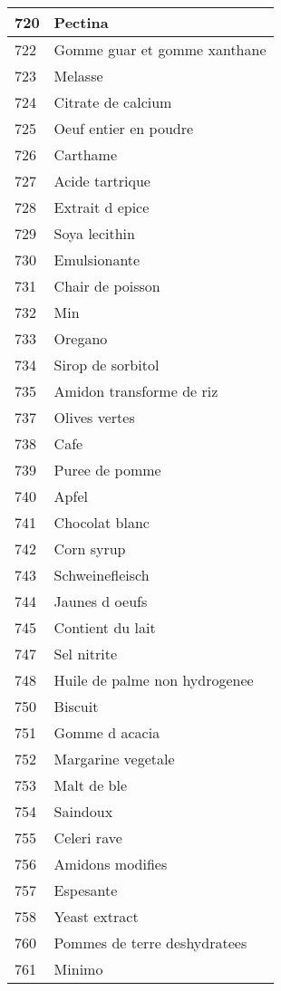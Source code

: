 \begin{longtable}{|l|l|}
720 & Pectina \\ \hline 
722 & Gomme guar et gomme xanthane \\ \hline 
723 & Melasse \\ \hline 
724 & Citrate de calcium \\ \hline 
725 & Oeuf entier en poudre \\ \hline 
726 & Carthame \\ \hline 
727 & Acide tartrique \\ \hline 
728 & Extrait d epice \\ \hline 
729 & Soya lecithin \\ \hline 
730 & Emulsionante \\ \hline 
731 & Chair de poisson \\ \hline 
732 & Min \\ \hline 
733 & Oregano \\ \hline 
734 & Sirop de sorbitol \\ \hline 
735 & Amidon transforme de riz \\ \hline 
737 & Olives vertes \\ \hline 
738 & Cafe \\ \hline 
739 & Puree de pomme \\ \hline 
740 & Apfel \\ \hline 
741 & Chocolat blanc \\ \hline 
742 & Corn syrup \\ \hline 
743 & Schweinefleisch \\ \hline 
744 & Jaunes d oeufs \\ \hline 
745 & Contient du lait \\ \hline 
747 & Sel nitrite \\ \hline 
748 & Huile de palme non hydrogenee \\ \hline 
750 & Biscuit \\ \hline 
751 & Gomme d acacia \\ \hline 
752 & Margarine vegetale \\ \hline 
753 & Malt de ble \\ \hline 
754 & Saindoux \\ \hline 
755 & Celeri rave \\ \hline 
756 & Amidons modifies \\ \hline 
757 & Espesante \\ \hline 
758 & Yeast extract \\ \hline 
760 & Pommes de terre deshydratees \\ \hline 
761 & Minimo \\ \hline 

\end{longtable}

